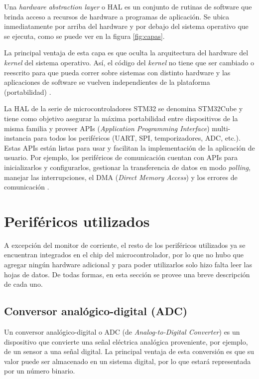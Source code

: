 Una \textit{hardware abstraction layer} o HAL es un conjunto de rutinas de software que brinda acceso a recursos de hardware a programas de aplicación. Se ubica inmediatamente por arriba del hardware y por debajo del sistema operativo que se ejecuta, como se puede ver en la figura \ref{fig:capas}.

La principal ventaja de esta capa es que oculta la arquitectura del hardware del \textit{kernel} del sistema operativo. Así, el código del \textit{kernel} no tiene que ser cambiado o reescrito para que pueda correr sobre sistemas con distinto hardware y las aplicaciones de software se vuelven independientes de la plataforma (portabilidad) \citep{WEBSITE:HAL}.

La HAL de la serie de microcontroladores STM32 se denomina STM32Cube y tiene como objetivo asegurar la máxima portabilidad entre dispositivos de la misma familia y proveer APIs (\textit{Application Programming Interface}) multi-instancia para todos los periféricos (UART, SPI, temporizadores, ADC, etc.). Estas APIs están listas para usar y facilitan la implementación de la aplicación de usuario. Por ejemplo, los periféricos de comunicación cuentan con APIs para inicializarlos y configurarlos, gestionar la transferencia de datos en modo \textit{polling}, manejar las interrupciones, el DMA (\textit{Direct Memory Access}) y los errores de comunicación \citep{WEBSITE:STM32CUBE}.

\section{Periféricos utilizados}

A excepción del monitor de corriente, el resto de los periféricos utilizados ya se encuentran integrados en el chip del microcontrolador, por lo que no hubo que agregar ningún hardware adicional y para poder utilizarlos solo hizo falta leer las hojas de datos. De todas formas, en esta sección se provee una breve descripción de cada uno.

\subsection{Conversor analógico-digital (ADC)}

Un conversor analógico-digital o ADC (de \textit{Analog-to-Digital Converter}) es un dispositivo que convierte una señal eléctrica analógica proveniente, por ejemplo, de un sensor a una señal digital. La principal ventaja de esta conversión es que su valor puede ser almacenado en un sistema digital, por lo que estará representada por un número binario.

